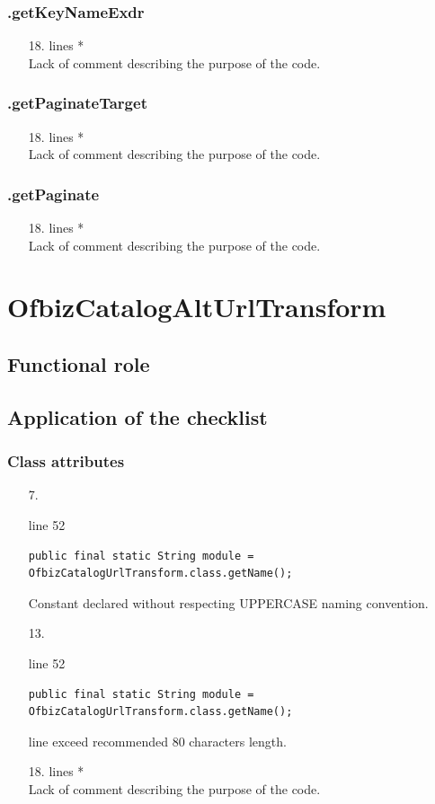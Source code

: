 \documentclass[english]{article}
\begin{document}
\subsubsection*{.getKeyNameExdr}
\begin{itemize}
\item[18.]{lines  *\\
		Lack of comment describing the purpose of the code.}
\end{itemize}
\subsubsection*{.getPaginateTarget}
\begin{itemize}
\item[18.]{lines  *\\
		Lack of comment describing the purpose of the code.}
\end{itemize}
\subsubsection*{.getPaginate}
\begin{itemize}
\item[18.]{lines  *\\
		Lack of comment describing the purpose of the code.}
\end{itemize}


\section{OfbizCatalogAltUrlTransform}
	\subsection{Functional role}
	\subsection{Application of the checklist}

\subsubsection*{Class attributes }	
\begin{itemize}

\item[7.]{line 52
		\begin{lstlisting} 
public final static String module = OfbizCatalogUrlTransform.class.getName();
		\end{lstlisting}
		Constant declared without respecting UPPERCASE naming convention.}

\item[13.]{line 52
		\begin{lstlisting} 
public final static String module = OfbizCatalogUrlTransform.class.getName();
		\end{lstlisting}
		line exceed recommended 80 characters length.}
		
		\item[18.]{lines  *\\
		Lack of comment describing the purpose of the code.}
\end{itemize}
	
\end{document}
